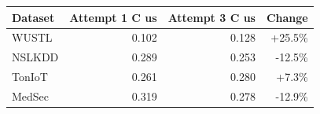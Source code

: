 \begin{tabular}{lrrr}
\toprule
Dataset & Attempt 1 C us & Attempt 3 C us & Change \\
\midrule
WUSTL & 0.102 & 0.128 & +25.5\% \\
NSLKDD & 0.289 & 0.253 & -12.5\% \\
TonIoT & 0.261 & 0.280 & +7.3\% \\
MedSec & 0.319 & 0.278 & -12.9\% \\
\bottomrule
\end{tabular}

